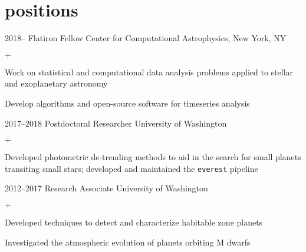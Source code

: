 \documentclass[]{luger-cv} %
\begin{document}

\section{positions}

\begin{entrylist}


    \entry
    {2018--}
    {Flatiron Fellow}
    {Center for Computational Astrophysics, New York, NY}
    {%
        \vspace{-1em}
        \begin{list}{$+$}{\cvlist}
            \item Work on statistical and computational data analysis problems
                  \ifdefined \onepage \else
                      applied to stellar and exoplanetary astronomy
                  \fi
            \item Develop algorithms and open-source software for timeseries analysis
        \end{list}
    }


    \entry
    {2017--2018}
    {Postdoctoral Researcher}
    {University of Washington}
    {%
        \vspace{-1em}
        \begin{list}{$+$}{\cvlist}
            \item Developed photometric de-trending methods to aid in the search for small
                  planets transiting small stars; developed and maintained the \texttt{everest} pipeline
        \end{list}
    }


    \entry
    {2012--2017}
    {Research Associate}
    {University of Washington}
    {%
        \vspace{-1em}
        \begin{list}{$+$}{\cvlist}
            \item Developed techniques to detect and characterize habitable
                  zone planets
            \item Investigated the atmospheric evolution of planets orbiting M dwarfs
        \end{list}
    }


\end{entrylist}
\end{document}
